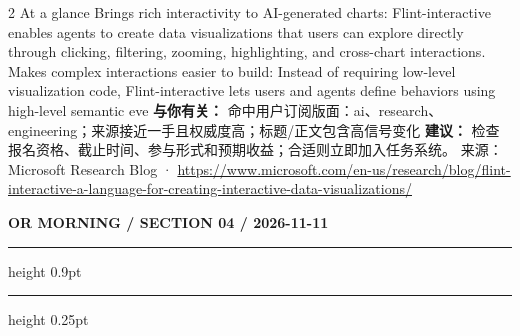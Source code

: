 \documentclass[10.5pt]{ctexart}
\begin{document}
\begin{multicols}{2}
At a glance Brings rich interactivity to AI-generated charts: Flint-interactive enables agents to create data visualizations that users can explore directly through clicking, filtering, zooming, highlighting, and cross-chart interactions. Makes complex interactions easier to build: Instead of requiring low-level visualization code, Flint-interactive lets users and agents define behaviors using high-level semantic eve
\textbf{与你有关：} 命中用户订阅版面：ai、research、engineering；来源接近一手且权威度高；标题/正文包含高信号变化
\textbf{建议：} 检查报名资格、截止时间、参与形式和预期收益；合适则立即加入任务系统。
{\footnotesize\color{ormuted} 来源：Microsoft Research Blog · \url{https://www.microsoft.com/en-us/research/blog/flint-interactive-a-language-for-creating-interactive-data-visualizations/}}
\end{multicols}
\newpage
{\small\bfseries OR MORNING / SECTION 04 / 2026-11-11}
\vspace{2mm}
\hrule height 0.9pt
\vspace{1.5mm}
\hrule height 0.25pt
\vspace{4mm}
\end{document}
